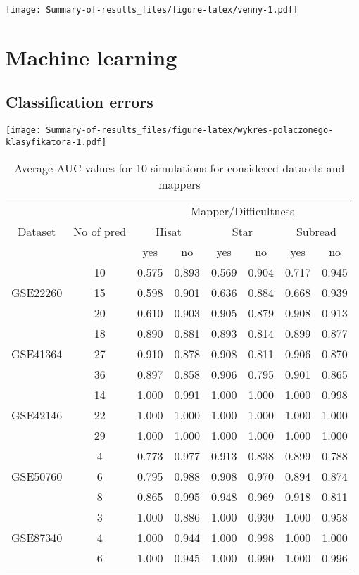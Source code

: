 \documentclass[
  11pt,
]{article}
\begin{document}
\texttt{[image: Summary-of-results\_files/figure-latex/venny-1.pdf]}

\hypertarget{machine-learning}{%
\section{Machine learning}\label{machine-learning}}

\hypertarget{classification-errors}{%
\subsection{Classification errors}\label{classification-errors}}

\texttt{[image: Summary-of-results\_files/figure-latex/wykres-polaczonego-klasyfikatora-1.pdf]}

\begin{table}[ht!]
\centering
\caption{Average AUC values for 10 simulations for considered datasets and mappers} 
\label{tab-AUC}
\begin{tabular}{c|c|cc|cc|cc}
   \hline \multirow{3}{*}{Dataset} & \multirow{3}{*}{No of pred} & \multicolumn{6}{c}{Mapper/Difficultness} \\
 \cline{3-8}  & & \multicolumn{2}{c|}{Hisat}& \multicolumn{2}{c|}{Star} & \multicolumn{2}{c}{Subread}\\
  & & yes & no &  yes & no &  yes & no \\
 \hline
 & 10 & 0.575 & 0.893 & 0.569 & 0.904 & 0.717 & 0.945 \\ 
  GSE22260 & 15 & 0.598 & 0.901 & 0.636 & 0.884 & 0.668 & 0.939 \\ 
   & 20 & 0.610 & 0.903 & 0.905 & 0.879 & 0.908 & 0.913 \\ 
   \hline
 & 18 & 0.890 & 0.881 & 0.893 & 0.814 & 0.899 & 0.877 \\ 
  GSE41364 & 27 & 0.910 & 0.878 & 0.908 & 0.811 & 0.906 & 0.870 \\ 
   & 36 & 0.897 & 0.858 & 0.906 & 0.795 & 0.901 & 0.865 \\ 
   \hline
 & 14 & 1.000 & 0.991 & 1.000 & 1.000 & 1.000 & 0.998 \\ 
  GSE42146 & 22 & 1.000 & 1.000 & 1.000 & 1.000 & 1.000 & 1.000 \\ 
   & 29 & 1.000 & 1.000 & 1.000 & 1.000 & 1.000 & 1.000 \\ 
   \hline
 & 4 & 0.773 & 0.977 & 0.913 & 0.838 & 0.899 & 0.788 \\ 
  GSE50760 & 6 & 0.795 & 0.988 & 0.908 & 0.970 & 0.894 & 0.874 \\ 
   & 8 & 0.865 & 0.995 & 0.948 & 0.969 & 0.918 & 0.811 \\ 
   \hline
 & 3 & 1.000 & 0.886 & 1.000 & 0.930 & 1.000 & 0.958 \\ 
  GSE87340 & 4 & 1.000 & 0.944 & 1.000 & 0.998 & 1.000 & 1.000 \\ 
   & 6 & 1.000 & 0.945 & 1.000 & 0.990 & 1.000 & 0.996 \\ 
  \end{tabular}
\end{table}

  
\end{document}
